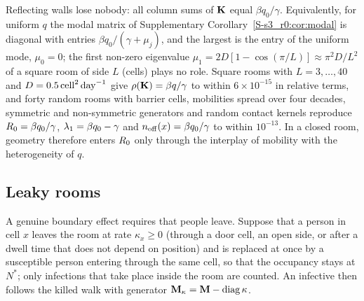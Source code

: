 Reflecting walls lose nobody: all column sums of $\mathbf{K}$ equal $\beta q_0/\gamma$. Equivalently, for uniform $q$
the modal matrix of Supplementary Corollary~\ref{S-s3_r0:cor:modal} is diagonal with entries
$\beta q_0/(\gamma+\mu_j)$, and the largest is the entry of the uniform mode, $\mu_0=0$; the first non-zero
eigenvalue $\mu_1=2D[1-\cos(\pi/L)]\approx\pi^2D/L^2$ of a square room of side $L$ (cells) plays no role. Square rooms with $L=3,\dots,40$ and
$D=0.5\,\mathrm{cell}^2\,\mathrm{day}^{-1}$ give $\rho(\mathbf{K})=\beta q/\gamma$ to within $6\times10^{-15}$ in relative terms, and forty
random rooms with barrier cells, mobilities spread over four decades, symmetric and non-symmetric generators
and random contact kernels reproduce $R_0=\beta q_0/\gamma$, $\lambda_1=\beta q_0-\gamma$ and
$n_{\mathrm{off}}(x)=\beta q_0/\gamma$ to within $10^{-13}$. In a closed room, geometry therefore enters $R_0$ only through
the interplay of mobility with the heterogeneity of $q$.

\subsection{Leaky rooms}\label{s4_geometry:sec:leaky}

A genuine boundary effect requires that people leave. Suppose that a person in cell $x$ leaves the room at
rate $\kappa_x\ge0$ (through a door cell, an open side, or after a dwell time that does not depend on
position) and is replaced at once by a susceptible person entering through the same cell, so that the
occupancy stays at $N^*$; only infections that take place inside the room are counted. An infective then
follows the killed walk with generator $\mathbf{M}_{\kappa}=\mathbf{M}-\operatorname{diag}\kappa$.

